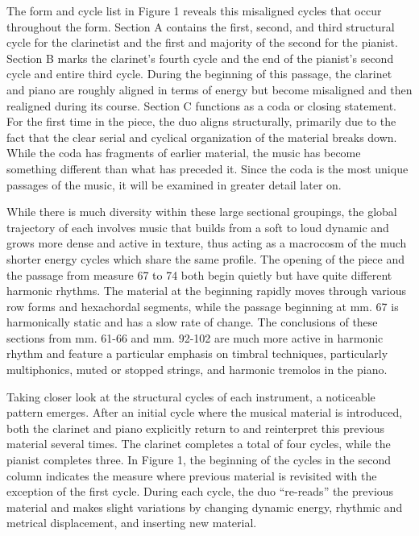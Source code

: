 The form and cycle list in Figure 1 reveals this misaligned cycles that occur throughout the form. Section A contains the first, second, and third structural cycle for the clarinetist and the first and majority of the second for the pianist. Section B marks the clarinet's fourth cycle and the end of the pianist's second cycle and entire third cycle. During the beginning of this passage, the clarinet and piano are roughly aligned in terms of energy but become misaligned and then realigned during its course. Section C functions as a coda or closing statement. For the first time in the piece, the duo aligns structurally, primarily due to the fact that the clear serial and cyclical organization of the material breaks down. While the coda has fragments of earlier material, the music has become something different than what has preceded it. Since the coda is the most unique passages of the music, it will be examined in greater detail later on.

While there is much diversity within these large sectional groupings, the global trajectory of each involves music that builds from a soft to loud dynamic and grows more dense and active in texture, thus acting as a macrocosm of the much shorter energy cycles which share the same profile. The opening of the piece and the passage from measure 67 to 74 both begin quietly but have quite different harmonic rhythms. The material at the beginning rapidly moves through various row forms and hexachordal segments, while the passage beginning at mm. 67 is harmonically static and has a slow rate of change. The conclusions of these sections from mm. 61-66 and mm. 92-102 are much more active in harmonic rhythm and feature a particular emphasis on timbral techniques, particularly multiphonics, muted or stopped strings, and harmonic tremolos in the piano.

Taking closer look at the structural cycles of each instrument, a noticeable pattern emerges. After an initial cycle where the musical material is introduced, both the clarinet and piano explicitly return to and reinterpret this previous material several times. The clarinet completes a total of four cycles, while the pianist completes three. In Figure 1, the beginning of the cycles in the second column indicates the measure where previous material is revisited with the exception of the first cycle. During each cycle, the duo ``re-reads'' the previous material and makes slight variations by changing dynamic energy, rhythmic and metrical displacement, and inserting new material.

